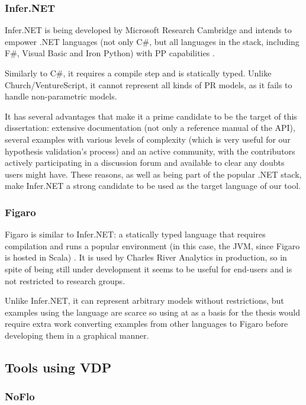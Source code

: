\subsubsection{Infer.NET}

Infer.NET is being developed by Microsoft Research Cambridge and intends to
empower .NET languages (not only C\#, but all languages in the stack, including
F\#, Visual Basic and Iron Python) with PP capabilities \cite{InferNET14}.

Similarly to C\#, it requires a compile step and is statically typed. Unlike
Church/VentureScript, it cannot represent all kinds of PR models, as it fails to handle
non-parametric models.

It has several advantages
that make it a prime candidate to be the target of this dissertation: extensive
documentation (not only a reference manual of the API), several examples with
various levels of complexity (which is very useful for our hypothesis validation's
process) and an active community, with the contributors
actively participating in a discussion forum and available to clear any doubts
users might have. These reasons, as well as being part of the popular .NET
stack, make Infer.NET a strong candidate to be used as the target language of our tool.

\subsubsection{Figaro}

Figaro is similar to Infer.NET: a statically typed language that requires compilation
and runs a popular environment (in this case, the JVM, since Figaro is hosted in
Scala) \cite{figarot}. It is used by Charles River Analytics in production, so
in spite of being still under development it seems to be useful for end-users and
is not restricted to research groups.

Unlike Infer.NET, it can represent arbitrary models without restrictions, but
examples using the language are scarce so using at as a basis for the thesis
would require extra work converting examples from other languages to Figaro
before developing them in a graphical manner.

\subsection{Tools using VDP}
\label{sec:sotavdp}

\subsubsection{NoFlo}
\label{sec:noflo}

